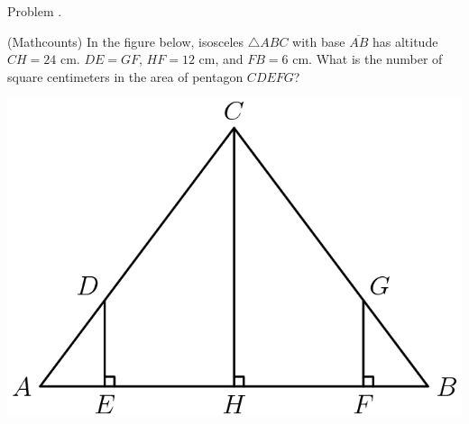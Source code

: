 \documentclass[9pt]{beamer}
\newcounter{problem}[section]
\begin{document}
\begin{frame}[t, fragile]{Problem \thesection.\theproblem}
    \begin{block}{}
    (Mathcounts) In the figure below, isosceles $\triangle ABC$ with base $\overline{AB}$ has altitude $CH = 24$ cm. $DE = GF$, $HF = 12$ cm, and $FB = 6$ cm. What is the number of square centimeters in the area of pentagon $CDEFG$?
    
    \end{block}
    \begin{center}
        \includegraphics[scale=0.4]{dcfaf4dab16fff71a2813f8c7f8bc6417390e865.png}
    \end{center}
\end{frame}
\end{document}
